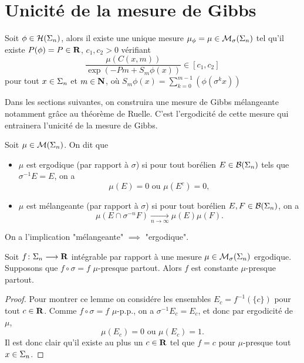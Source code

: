 \section{Unicité de la mesure de Gibbs}

\begin{theorem} \label{thm:gibbs}
    Soit $\phi \in \mathcal H(\Sigma_n)$, alors il existe une unique mesure $\mu_{\phi} = \mu \in \mathcal M_{\sigma}(\Sigma_n)$ tel qu'il existe
    $P(\phi) = P \in \mathbf R$, $c_1, c_2 > 0$ vérifiant
    $$\frac{\mu(C(x, m))}{\exp(-Pm + S_m\phi(x))} \in [c_1, c_2]$$
    pour tout $x \in \Sigma_n$ et $m \in \mathbf N$, où $S_m\phi(x) = \sum_{k=0}^{m-1}(\phi(\sigma^k x))$
  \end{theorem}

  Dans les sections suivantes, on construira une mesure de Gibbs mélangeante notamment grâce au théorème de Ruelle.
  C'est l'ergodicité de cette mesure qui entrainera l'unicité de la mesure de Gibbs.

  \begin{definition}
    Soit $\mu \in \mathcal{M}(\Sigma_{n})$. On dit que
    \begin{itemize}
      \item $\mu$ est ergodique (par rapport à $\sigma$) si pour tout borélien $E \in \mathcal{B}(\Sigma_n)$ tels que $\sigma^{-1}E=E$, on a
	$$\mu(E) = 0 \text{ ou } \mu(E^c) = 0,$$
      \item $\mu$ est mélangeante (par rapport à $\sigma$) si pour tout borélien $E, F \in \mathcal{B}(\Sigma_n)$, on a
	$$\mu(E\cap\sigma^{-n}F) \underset{n\to\infty}{\longrightarrow} \mu(E)\mu(F).$$
    \end{itemize}
  \end{definition}

  \begin{remark}
    On a l'implication "mélangeante" $\implies$ "ergodique".
  \end{remark}

  \begin{lemma}
    Soit $f \colon \Sigma_n \longrightarrow \mathbf R$ intégrable par rapport à une mesure $\mu \in \mathcal{M}_{\sigma}(\Sigma_{n})$ ergodique.
    Supposons que $f \circ \sigma = f$ $\mu$-presque partout.
    Alors $f$ est constante $\mu$-presque partout.
  \end{lemma}

  \begin{proof}
    Pour montrer ce lemme on considére les ensembles $E_c = f^{-1}(\{c\})$ pour tout $c\in\mathbf R$.
    Comme $f \circ \sigma = f$ $\mu$-p.p., on a $\sigma^{-1}E_c = E_c$, et donc par ergodicité de $\mu$,
    $$\mu(E_c) = 0 \text{ ou } \mu(E_c) = 1.$$
    Il est donc clair qu'il existe au plus un $c\in\mathbf R$ tel que $f = c$ pour $\mu$-presque tout $x \in \Sigma_n$.
  \end{proof}

